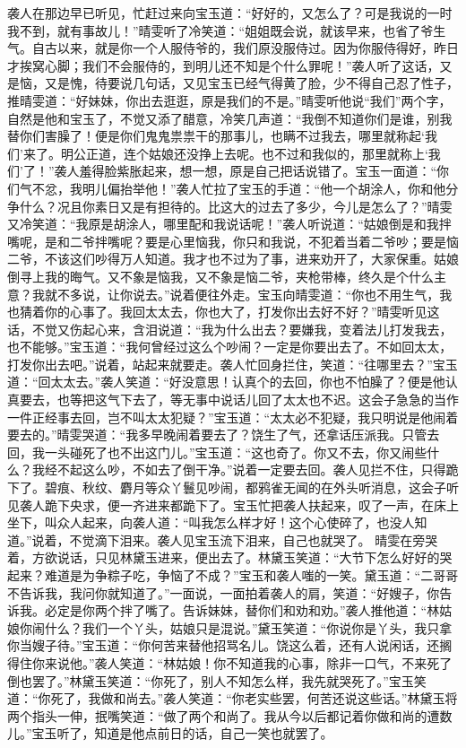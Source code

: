 \documentclass[12pt,oneside]{book}
\begin{document}
袭人在那边早已听见，忙赶过来向宝玉道：“好好的，又怎么了？可是我说的一时我不到，就有事故儿！”晴雯听了冷笑道：“姐姐既会说，就该早来，也省了爷生气。自古以来，就是你一个人服侍爷的，我们原没服侍过。因为你服侍得好，昨日才挨窝心脚；我们不会服侍的，到明儿还不知是个什么罪呢！”袭人听了这话，又是恼，又是愧，待要说几句话，又见宝玉已经气得黄了脸，少不得自己忍了性子，推晴雯道：“好妹妹，你出去逛逛，原是我们的不是。”晴雯听他说“我们”两个字，自然是他和宝玉了，不觉又添了醋意，冷笑几声道：“我倒不知道你们是谁，别我替你们害臊了！便是你们鬼鬼祟祟干的那事儿，也瞒不过我去，哪里就称起‘我们’来了。明公正道，连个姑娘还没挣上去呢。也不过和我似的，那里就称上‘我们’了！”袭人羞得脸紫胀起来，想一想，原是自己把话说错了。宝玉一面道：“你们气不忿，我明儿偏抬举他！”袭人忙拉了宝玉的手道：“他一个胡涂人，你和他分争什么？况且你素日又是有担待的。比这大的过去了多少，今儿是怎么了？”晴雯又冷笑道：“我原是胡涂人，哪里配和我说话呢！”袭人听说道：“姑娘倒是和我拌嘴呢，是和二爷拌嘴呢？要是心里恼我，你只和我说，不犯着当着二爷吵；要是恼二爷，不该这们吵得万人知道。我才也不过为了事，进来劝开了，大家保重。姑娘倒寻上我的晦气。又不象是恼我，又不象是恼二爷，夹枪带棒，终久是个什么主意？我就不多说，让你说去。”说着便往外走。宝玉向晴雯道：“你也不用生气，我也猜着你的心事了。我回太太去，你也大了，打发你出去好不好？”晴雯听见这话，不觉又伤起心来，含泪说道：“我为什么出去？要嫌我，变着法儿打发我去，也不能够。”宝玉道：“我何曾经过这么个吵闹？一定是你要出去了。不如回太太，打发你出去吧。”说着，站起来就要走。袭人忙回身拦住，笑道：“往哪里去？”宝玉道：“回太太去。”袭人笑道：“好没意思！认真个的去回，你也不怕臊了？便是他认真要去，也等把这气下去了，等无事中说话儿回了太太也不迟。这会子急急的当作一件正经事去回，岂不叫太太犯疑？”宝玉道：“太太必不犯疑，我只明说是他闹着要去的。”晴雯哭道：“我多早晚闹着要去了？饶生了气，还拿话压派我。只管去回，我一头碰死了也不出这门儿。”宝玉道：“这也奇了。你又不去，你又闹些什么？我经不起这么吵，不如去了倒干净。”说着一定要去回。袭人见拦不住，只得跪下了。碧痕、秋纹、麝月等众丫鬟见吵闹，都鸦雀无闻的在外头听消息，这会子听见袭人跪下央求，便一齐进来都跪下了。宝玉忙把袭人扶起来，叹了一声，在床上坐下，叫众人起来，向袭人道：“叫我怎么样才好！这个心使碎了，也没人知道。”说着，不觉滴下泪来。袭人见宝玉流下泪来，自己也就哭了。
晴雯在旁哭着，方欲说话，只见林黛玉进来，便出去了。林黛玉笑道：“大节下怎么好好的哭起来？难道是为争粽子吃，争恼了不成？”宝玉和袭人嗤的一笑。黛玉道：“二哥哥不告诉我，我问你就知道了。”一面说，一面拍着袭人的肩，笑道：“好嫂子，你告诉我。必定是你两个拌了嘴了。告诉妹妹，替你们和劝和劝。”袭人推他道：“林姑娘你闹什么？我们一个丫头，姑娘只是混说。”黛玉笑道：“你说你是丫头，我只拿你当嫂子待。”宝玉道：“你何苦来替他招骂名儿。饶这么着，还有人说闲话，还搁得住你来说他。”袭人笑道：“林姑娘！你不知道我的心事，除非一口气，不来死了倒也罢了。”林黛玉笑道：“你死了，别人不知怎么样，我先就哭死了。”宝玉笑道：“你死了，我做和尚去。”袭人笑道：“你老实些罢，何苦还说这些话。”林黛玉将两个指头一伸，抿嘴笑道：“做了两个和尚了。我从今以后都记着你做和尚的遭数儿。”宝玉听了，知道是他点前日的话，自己一笑也就罢了。
\end{document}
